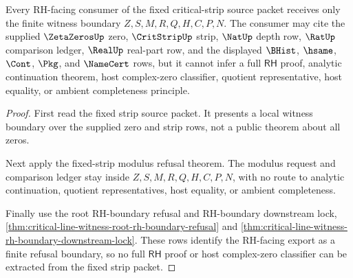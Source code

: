 \begin{theorem}
\label{thm:critical-line-witness-rh-consumer-nonescape}
Every RH-facing consumer of the fixed critical-strip source packet receives only the finite witness boundary $Z,S,M,R,Q,H,C,P,N$. The consumer may cite the supplied $\ZetaZerosUp$ zero, $\CritStripUp$ strip, $\NatUp$ depth row, $\RatUp$ comparison ledger, $\RealUp$ real-part row, and the displayed $\BHist$, $\hsame$, $\Cont$, $\Pkg$, and $\NameCert$ rows, but it cannot infer a full $\mathsf{RH}$ proof, analytic continuation theorem, host complex-zero classifier, quotient representative, host equality, or ambient completeness principle.
\end{theorem}
\begin{proof}
First read the fixed strip source packet. It presents a local witness boundary over the supplied zero and strip rows, not a public theorem about all zeros.

Next apply the fixed-strip modulus refusal theorem. The modulus request and comparison ledger stay inside $Z,S,M,R,Q,H,C,P,N$, with no route to analytic continuation, quotient representatives, host equality, or ambient completeness.

Finally use the root RH-boundary refusal and RH-boundary downstream lock, \autoref{thm:critical-line-witness-root-rh-boundary-refusal} and \autoref{thm:critical-line-witness-rh-boundary-downstream-lock}. These rows identify the RH-facing export as a finite refusal boundary, so no full $\mathsf{RH}$ proof or host complex-zero classifier can be extracted from the fixed strip packet.
\end{proof}

